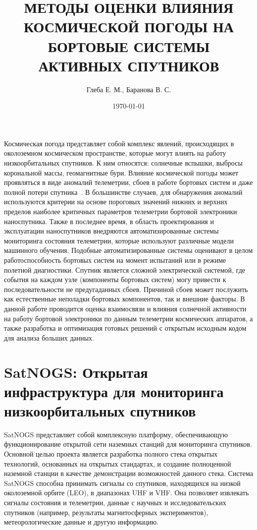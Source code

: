 \documentclass[14pt, a4paper]{../cls/coursework}
\title{МЕТОДЫ ОЦЕНКИ ВЛИЯНИЯ КОСМИЧЕСКОЙ ПОГОДЫ НА БОРТОВЫЕ СИСТЕМЫ АКТИВНЫХ СПУТНИКОВ}
\author{Глеба Е. М., Баранова В. С.}
\date{\today}
\begin{document}

    Космическая погода представляет собой комплекс явлений, происходящих в околоземном космическом пространстве, которые могут влиять на работу низкоорбитальных спутников.
    К ним относятся: солнечные вспышки, выбросы корональной массы, геомагнитные бури.
    Влияние космической погоды может проявляться в виде аномалий телеметрии, сбоев в работе бортовых систем и даже полной потери спутника~\cite{green_2017_impact}.
    В большинстве случаев, для обнаружения аномалий используются критерии на основе пороговых значений нижних и верхних пределов наиболее критичных параметров телеметрии бортовой электроники наноспутника.
    Также в последнее время, в область проектирования и эксплуатации наноспутников внедряются автоматизированные системы мониторинга состояния телеметрии, которые используют различные модели машинного обучения\cite{schlag_2018_numerical}.
    Подобные автоматизированные системы оценивают в целом работоспособность бортовых систем на момент испытаний или в режиме полетной диагностики.
    Спутник является сложной электрической системой, где события на каждом узле (компоненты бортовых систем) могу привести к последовательности не предугаданных сбоев.
    Причиной сбоев может послужить как естественные неполадки бортовых компонентов, так и внешние факторы.
    В данной работе проводится оценка взаимосвязи и влияния солнечной активности на работу бортовой электроники по данным телеметрии космических аппаратов, а также разработка и оптимизация готовых решений с открытым исходным кодом для анализа больших данных.

    \newpage


    \chapter{SatNOGS: Открытая инфраструктура для мониторинга низкоорбитальных спутников}

    SatNOGS представляет собой комплексную платформу, обеспечивающую функционирование открытой сети наземных станций для мониторинга спутников.
    Основной целью проекта является разработка полного стека открытых технологий, основанных на открытых стандартах, и создание полноценной наземной станции в качестве демонстрации возможностей данного стека.
    Система SatNOGS способна принимать сигналы со спутников, находящихся на низкой околоземной орбите (LEO), в диапазонах UHF и VHF. Она позволяет извлекать сигналы состояния и телеметрии, данные с научных и исследовательских спутников (например, результаты магнитосферных экспериментов), метеорологические данные и другую информацию.
\end{document}
